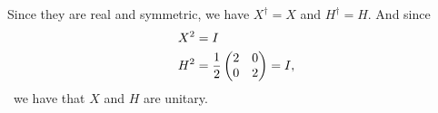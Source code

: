 Since they are real and symmetric, we have $X^\dag = X$ and $H^\dag = H$. And since
\begin{align*}
  X^2 &= I\\
  H^2 &= \frac{1}{2}\begin{pmatrix}2 & 0\\0 & 2\\ \end{pmatrix} = I,
\end{align*}\
we have that $X$ and $H$ are unitary.


